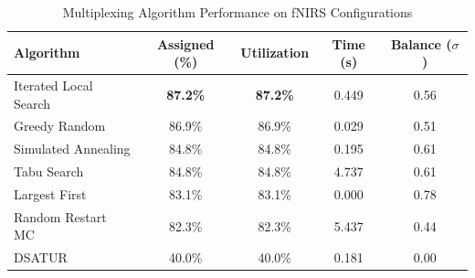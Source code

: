 \begin{table}[h]
\centering
\caption{Multiplexing Algorithm Performance on fNIRS Configurations}
\label{tab:results}
\begin{tabular}{@{}lcccc@{}}
\toprule
Algorithm & Assigned (\%) & Utilization & Time (s) & Balance ($\sigma$) \\
\midrule
Iterated Local Search & \textbf{87.2\%} & \textbf{87.2\%} & 0.449 & 0.56 \\
Greedy Random & 86.9\% & 86.9\% & 0.029 & 0.51 \\
Simulated Annealing & 84.8\% & 84.8\% & 0.195 & 0.61 \\
Tabu Search & 84.8\% & 84.8\% & 4.737 & 0.61 \\
Largest First & 83.1\% & 83.1\% & 0.000 & 0.78 \\
Random Restart MC & 82.3\% & 82.3\% & 5.437 & 0.44 \\
DSATUR & 40.0\% & 40.0\% & 0.181 & 0.00 \\
\bottomrule
\end{tabular}
\end{table}